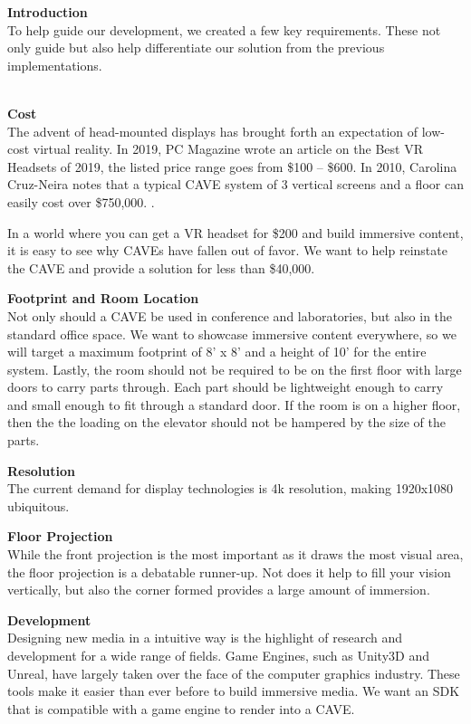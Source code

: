 


\noindent\textbf{Introduction}\\
	To help guide our development, we created a few key requirements. These not only guide but also help differentiate our solution from the previous implementations.


\filbreak
{} \\

\filbreak
\noindent\textbf{Cost}\\
	The advent of head-mounted displays has brought forth an expectation of low-cost virtual reality. In 2019, PC Magazine  wrote an article on the Best VR Headsets of 2019, the listed price range goes from \$100 -- \$600. \cite{bestHMDs} 
	In 2010, Carolina Cruz-Neira notes that a typical CAVE system of 3 vertical screens and a floor can easily cost over \$750,000. \cite{ccnSurround}. 
	
	In a world where you can get a VR headset for \$200 and build immersive content, it is easy to see why CAVEs have fallen out of favor. We want to help reinstate the CAVE and provide a solution for less than \$40,000.

\filbreak
\noindent\textbf{Footprint and Room Location}\\
	Not only should a CAVE be used in conference and laboratories, but also in the standard office space. We want to showcase immersive content everywhere, so we will target a maximum footprint of 8' x 8' and a height of 10' for the entire system. 
	Lastly, the room should not be required to be on the first floor with large doors to carry parts through. Each part should be lightweight enough to carry and small enough to fit through a standard door. If the room is on a higher floor, then the the loading on the elevator should not be hampered by the size of the parts.

\filbreak
\noindent\textbf{Resolution}\\
	The current demand for display technologies is 4k resolution, making 1920x1080 ubiquitous.

\filbreak
\noindent\textbf{Floor Projection}\\
	While the front projection is the most important as it draws the most visual area, the floor projection is a debatable runner-up. Not does it help to fill your vision vertically, but also the corner formed provides a large amount of immersion.
	
\filbreak
\noindent\textbf{Development}\\
	Designing new media in a intuitive way is the highlight of research and development for a wide range of fields. Game Engines, such as Unity3D and Unreal, have largely taken over the face of the computer graphics industry. These tools make it easier than ever before to build immersive media. We want an SDK that is compatible with a game engine to render into a CAVE.

